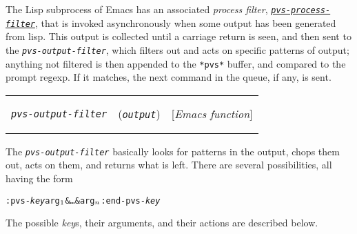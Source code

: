 \documentclass[12pt]{book}
\makeatletter
\newenvironment{function}[3]%
{\par\noindent\begin{boxedminipage}{\textwidth}%
 \par\noindent\begin{tabularx}{\linewidth}{l>{\raggedright}Xr}%
 \functionhtgt{#1}&(\texttt{\textit{#2}})&[\emph{#3}]%
 \end{tabularx}\par\flushright\begin{minipage}{.97\textwidth}}
{\end{minipage}\end{boxedminipage}}
\newcommand{\functionnm}[1]{\texttt{\textit{#1}}}
\newcommand{\functionhln}[1]{\hyperlink{#1}{\functionnm{#1}}}
\newcommand{\functionhtgt}[1]{\hypertarget{#1}{\functionnm{#1}}\index{#1@\functionnm{#1}|underline}}
\newenvironment{emacsfunction}[2]%
{\begin{function}{#1}{#2}{Emacs function}}{\end{function}}
\makeatother
\begin{document}
The Lisp subprocess of Emacs has an associated \emph{process
filter}, \functionhln{pvs-process-filter}, that is
invoked asynchronously when some output has been generated from lisp.
This output is collected until a carriage return is seen, and then sent to
the \functionnm{pvs-output-filter}, which filters out and acts on specific
patterns of output; anything not filtered is then appended to the
\texttt{*pvs*} buffer, and compared to the prompt regexp.  If it matches,
the next command in the queue, if any, is sent.

\begin{emacsfunction}{pvs-output-filter}{output}
The \functionnm{pvs-output-filter} basically looks for patterns in the
output, chops them out, acts on them, and returns what is left.  There are
several possibilities, all having the form
\begin{alltt}
  :pvs-\textit{key} arg\(\sb{1}\) \& \ldots \& arg\(\sb{n}\) :end-pvs-\textit{key}
\end{alltt}
The possible \textit{key}s, their arguments, and their actions are described
below.
\end{emacsfunction}
\end{document}
